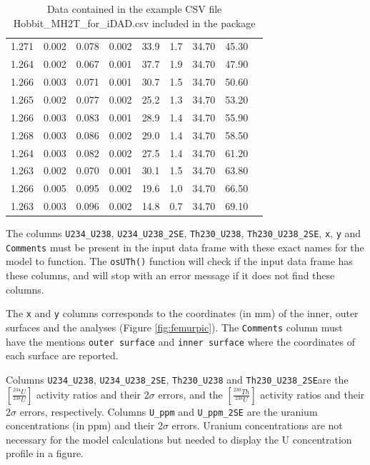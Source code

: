 \documentclass[]{elsarticle} %
\begin{document}
\begin{table}[ht]
\begin{tabular}{ccccccccc}
  1.271 & 0.002 & 0.078 & 0.002 & 33.9 & 1.7 & 34.70 & 45.30 &  \\ 
  1.264 & 0.002 & 0.067 & 0.001 & 37.7 & 1.9 & 34.70 & 47.90 &  \\ 
  1.266 & 0.003 & 0.071 & 0.001 & 30.7 & 1.5 & 34.70 & 50.60 &  \\ 
  1.265 & 0.002 & 0.077 & 0.002 & 25.2 & 1.3 & 34.70 & 53.20 &  \\ 
  1.266 & 0.003 & 0.083 & 0.001 & 28.9 & 1.4 & 34.70 & 55.90 &  \\ 
  1.268 & 0.003 & 0.086 & 0.002 & 29.0 & 1.4 & 34.70 & 58.50 &  \\ 
  1.264 & 0.003 & 0.082 & 0.002 & 27.5 & 1.4 & 34.70 & 61.20 &  \\ 
  1.263 & 0.002 & 0.070 & 0.001 & 30.1 & 1.5 & 34.70 & 63.80 &  \\ 
  1.266 & 0.005 & 0.095 & 0.002 & 19.6 & 1.0 & 34.70 & 66.50 &  \\ 
  1.263 & 0.003 & 0.096 & 0.002 & 14.8 & 0.7 & 34.70 & 69.10 &  \\ 
   \hline
\end{tabular}
\caption{\label{tab:hobbitone}Data contained in the example CSV file Hobbit\_MH2T\_for\_iDAD.csv included in the package} 
\end{table}

The columns \texttt{U234\_U238}, \texttt{U234\_U238\_2SE}, \texttt{Th230\_U238}, \texttt{Th230\_U238\_2SE}, \texttt{x}, \texttt{y} and \texttt{Comments} must be present in the input data frame with these exact names for the model to function. The \texttt{osUTh()} function will check if the input data frame has these columns, and will stop with an error message if it does not find these columns.

The \texttt{x} and \texttt{y} columns corresponds to the coordinates (in mm) of the inner, outer surfaces and the analyses (Figure \ref{fig:femurpic}). The \texttt{Comments} column must have the mentions \texttt{outer\ surface} and \texttt{inner\ surface} where the coordinates of each surface are reported.

Columns \texttt{U234\_U238}, \texttt{U234\_U238\_2SE}, \texttt{Th230\_U238} and \texttt{Th230\_U238\_2SE}are the \([\frac{^{234}U}{^{238}U}]\) activity ratios and their 2\(\sigma\) errors, and the \([\frac{^{230}Th}{^{238}U}]\) activity ratios and their 2\(\sigma\) errors, respectively.
Columns \texttt{U\_ppm} and \texttt{U\_ppm\_2SE} are the uranium concentrations (in ppm) and their 2\(\sigma\) errors. Uranium concentrations are not necessary for the model calculations but needed to display the U concentration profile in a figure.
\end{document}
